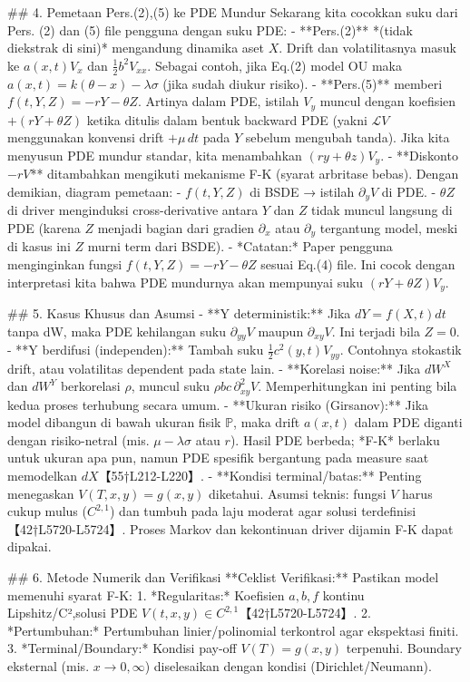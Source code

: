 \documentclass{article}
\begin{document}
## 4. Pemetaan Pers.(2),(5) ke PDE Mundur  
Sekarang kita cocokkan suku dari Pers. (2) dan (5) file pengguna dengan suku PDE:  
- **Pers.(2)** *(tidak diekstrak di sini)* mengandung dinamika aset \(X\). Drift dan volatilitasnya masuk ke \(a(x,t)V_x\) dan \(\tfrac12b^2V_{xx}\). Sebagai contoh, jika Eq.(2) model OU maka \(a(x,t)=k(\theta-x)-\lambda\sigma\) (jika sudah diukur risiko).  
- **Pers.(5)** memberi \(f(t,Y,Z) = -rY - \theta Z\). Artinya dalam PDE, istilah \(V_y\) muncul dengan koefisien \(+(rY+\theta Z)\) ketika ditulis dalam bentuk backward PDE (yakni \(\mathcal{L}V\) menggunakan konvensi drift \(+\mu\,dt\) pada \(Y\) sebelum mengubah tanda). Jika kita menyusun PDE mundur standar, kita menambahkan \((r y + \theta z)V_y\).  
- **Diskonto \(-rV\)** ditambahkan mengikuti mekanisme F-K (syarat arbritase bebas).  
Dengan demikian, diagram pemetaan: 
  - \(f(t,Y,Z)\) di BSDE → istilah \(\partial_yV\) di PDE. 
  - \(\theta Z\) di driver menginduksi cross-derivative antara \(Y\) dan \(Z\) tidak muncul langsung di PDE (karena \(Z\) menjadi bagian dari gradien \(\partial_x\) atau \(\partial_y\) tergantung model, meski di kasus ini \(Z\) murni term dari BSDE). 
  - *Catatan:* Paper pengguna menginginkan fungsi \(f(t,Y,Z)=-rY-\theta Z\) sesuai Eq.(4) file. Ini cocok dengan interpretasi kita bahwa PDE mundurnya akan mempunyai suku \((rY+\theta Z)V_y\).  

## 5. Kasus Khusus dan Asumsi  
- **Y deterministik:** Jika \(dY = f(X,t)dt\) tanpa dW, maka PDE kehilangan suku \(\partial_{yy}V\) maupun \(\partial_{xy}V\). Ini terjadi bila \(Z=0\).  
- **Y berdifusi (independen):** Tambah suku \(\tfrac12c^2(y,t)V_{yy}\). Contohnya stokastik drift, atau volatilitas dependent pada state lain.  
- **Korelasi noise:** Jika \(dW^X\) dan \(dW^Y\) berkorelasi \(\rho\), muncul suku \(\rho b c\,\partial^2_{xy}V\). Memperhitungkan ini penting bila kedua proses terhubung secara umum.  
- **Ukuran risiko (Girsanov):** Jika model dibangun di bawah ukuran fisik \(\mathbb{P}\), maka drift \(a(x,t)\) dalam PDE diganti dengan risiko-netral (mis. \(\mu-\lambda\sigma\) atau \(r\)). Hasil PDE berbeda; *F-K* berlaku untuk ukuran apa pun, namun PDE spesifik bergantung pada measure saat memodelkan \(dX\)【55†L212-L220】.  
- **Kondisi terminal/batas:** Penting menegaskan \(V(T,x,y)=g(x,y)\) diketahui. Asumsi teknis: fungsi \(V\) harus cukup mulus (\(C^{2,1}\)) dan tumbuh pada laju moderat agar solusi terdefinisi【42†L5720-L5724】. Proses Markov dan kekontinuan driver dijamin F-K dapat dipakai.  

## 6. Metode Numerik dan Verifikasi  
**Ceklist Verifikasi:** Pastikan model memenuhi syarat F-K:  
1. *Regularitas:* Koefisien \(a,b,f\) kontinu Lipshitz/C²,solusi PDE \(V(t,x,y)\in C^{2,1}\)【42†L5720-L5724】.  
2. *Pertumbuhan:* Pertumbuhan linier/polinomial terkontrol agar ekspektasi finiti.  
3. *Terminal/Boundary:* Kondisi pay-off \(V(T)=g(x,y)\) terpenuhi. Boundary eksternal (mis. \(x\to0,\infty\)) diselesaikan dengan kondisi (Dirichlet/Neumann).  
\end{document}
